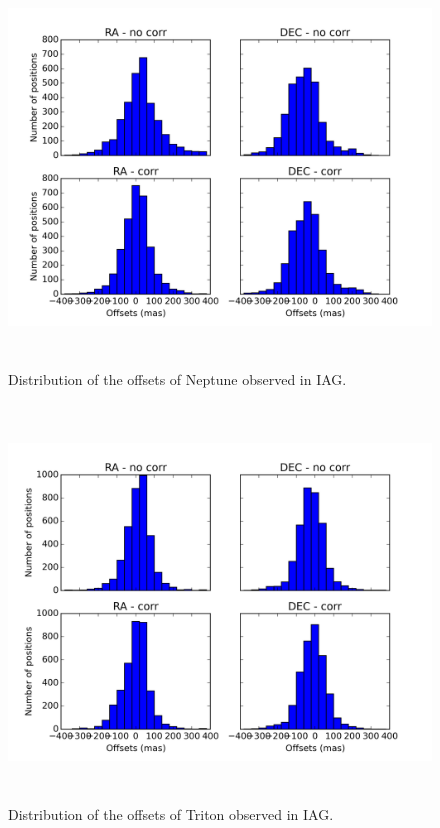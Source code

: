 \documentclass[12pt,a4paper]{report}
\begin{document}
\begin{figure}[H]
\centering
\includegraphics[height=10.5cm]{dist_Netuno_IAG.png} 
\caption{Distribution of the offsets of Neptune observed in IAG.}
\label{Fig:refraction-net-iag}
\end{figure}
\begin{figure}[H]
\centering
\includegraphics[height=10.5cm]{dist_Triton_IAG.png} 
\caption{Distribution of the offsets of Triton observed in IAG.}
\label{Fig:refraction-tri-iag}
\end{figure}
\end{document}
